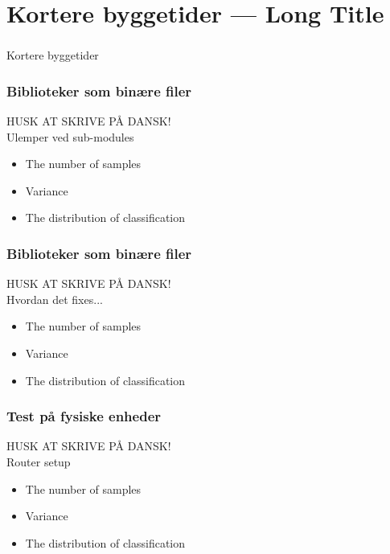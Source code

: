 \section[Kortere byggetider]{Kortere byggetider --- Long Title}

\begin{frame}
  \frametitle{}
  \begin{center}
    {\Huge Kortere byggetider}
  \end{center}
\end{frame}

\begin{frame}
    \frametitle{Biblioteker som binære filer}
    HUSK AT SKRIVE PÅ DANSK!\\
    Ulemper ved sub-modules
    \begin{itemize}
        \item The number of samples
        \item Variance
        \item The distribution of classification
    \end{itemize}
\end{frame}

\begin{frame}
    \frametitle{Biblioteker som binære filer}
    HUSK AT SKRIVE PÅ DANSK!\\
    Hvordan det fixes...
    \begin{itemize}
        \item The number of samples
        \item Variance
        \item The distribution of classification
    \end{itemize}
\end{frame}

\begin{frame}
    \frametitle{Test på fysiske enheder}
    HUSK AT SKRIVE PÅ DANSK!\\
    Router setup
    \begin{itemize}
        \item The number of samples
        \item Variance
        \item The distribution of classification
    \end{itemize}
\end{frame}

